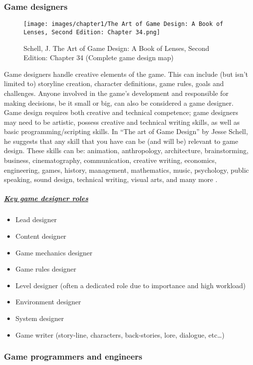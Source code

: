 \documentclass[../main.tex]{subfiles}
\begin{document}
\subsubsection{Game designers}
\begin{figure}[ht]
\centering
\texttt{[image: images/chapter1/The Art of Game Design: A Book of Lenses, Second Edition: Chapter 34.png]}
\caption{Schell, J. The Art of Game Design: A Book of Lenses, Second Edition: Chapter 34 (Complete game design map)}
\label{fig:Schell, J. The Art of Game Design: A Book of Lenses, Second Edition: Chapter 34 (Complete game design map)}
\end{figure}
Game designers handle creative elements of the game. This can include (but isn’t limited to) storyline creation, character definitions, game rules, goals and challenges. Anyone involved in the game’s development and responsible for making decisions, be it small or big, can also be considered a game designer. Game design requires both creative and technical competence; game designers may need to be artistic, possess creative and technical writing skills, as well as basic programming/scripting skills. In “The art of Game Design” by Jesse Schell, he suggests that any skill that you have can be (and will be) relevant to game design. These skills can be: animation, anthropology, architecture, brainstorming, business, cinematography, communication, creative writing, economics, engineering, games, history, management, mathematics, music, psychology, public speaking, sound design, technical writing, visual arts, and many more \cite{14}.
\subparagraph*{\underline{Key game designer roles}}
\begin{itemize}
    \item Lead designer
    \item Content designer
    \item Game mechanics designer
    \item Game rules designer
    \item Level designer (often a dedicated role due to importance and high workload)
    \item Environment designer
    \item System designer
    \item Game writer (story-line, characters, back-stories, lore, dialogue, etc…)

\end{itemize}
\subsubsection{Game programmers and engineers}
\end{document}
